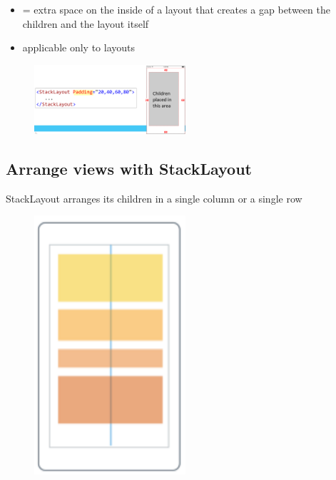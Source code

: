 \documentclass{article}
\begin{document}
\begin{itemize}
    \item = extra space on the inside of a layout that creates a gap between the children and the layout itself
    \item applicable only to layouts
\end{itemize}

\begin{figure}[H]
    \centering
    \includegraphics[width=0.5\textwidth]{xaml-padding.png}
    \caption{}
\end{figure}

\subsection{Arrange views with StackLayout}

StackLayout arranges its children in a single column or a single row

\begin{figure}[H]
    \centering
    \includegraphics[width=0.5\textwidth]{xaml-stacklayout.png}
    \caption{}
\end{figure}
\end{document}
